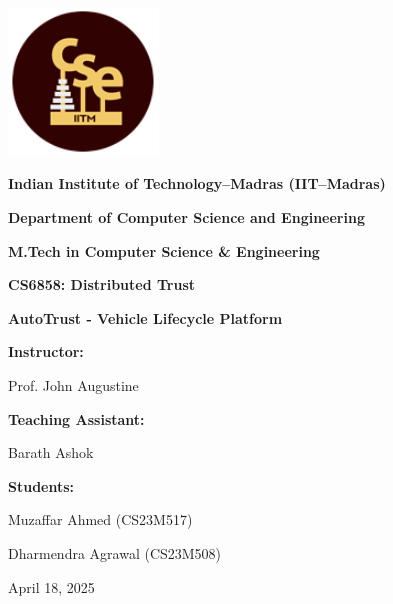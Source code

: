 \documentclass[12pt,a4paper]{article}
\begin{document}
    \begin{titlepage}
        \centering
        \includegraphics[width=0.3\textwidth]{CSE-IITM-Logo.png}\par
        \vspace{1cm}
        {\Large\textbf{Indian Institute of Technology--Madras (IIT--Madras)}\par}
        \vspace{0.5cm}
        {\large\textbf{Department of Computer Science and Engineering}\par}
        \vspace{0.5cm}
        {\large\textbf{M.Tech in Computer Science \& Engineering}\par}
        \vspace{1cm}
        {\Large\textbf{CS6858: Distributed Trust}\par}
        \vspace{1cm}
        {\Huge\bfseries AutoTrust - Vehicle Lifecycle Platform\par}
        \vspace{2cm}
        {\Large\textbf{Instructor:}}\par
        {\large Prof. John Augustine}\par
        \vspace{0.5cm}
        {\Large\textbf{Teaching Assistant:}}\par
        {\large Barath Ashok}\par
        \vspace{1cm}
        {\Large\textbf{Students:}}\par
        {\large Muzaffar Ahmed (CS23M517)}\par
        {\large Dharmendra Agrawal (CS23M508)}\par
        \vspace{2cm}
        {\large April 18, 2025\par}
    \end{titlepage}

    \clearpage
    \setcounter{tocdepth}{2}
    \tableofcontents
    \clearpage
\end{document}
